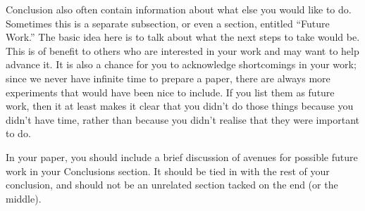 \documentclass[12pt, letterpaper]{article}
\begin{document}
Conclusion also often contain information about what else you would like
to do.  Sometimes this is a separate subsection, or even a section, entitled
``Future Work.''  The basic idea here is to talk about what the next steps to
take would be.  This is of benefit to others who are interested in your
work and may want to help advance it.  It is also a chance for you to
acknowledge shortcomings in your work; since we never have infinite time to
prepare a paper, there are always more experiments that would have been nice to
include.  If you list them as future work, then it at least makes it clear that
you didn't do those things because you didn't have time, rather than because you
didn't realise that they were important to do.

In your paper, you should include a brief discussion of avenues for possible
future work in your Conclusions section.  It should be tied in with the rest of
your conclusion, and should not be an unrelated section tacked on the end (or
the middle).





\end{document}
